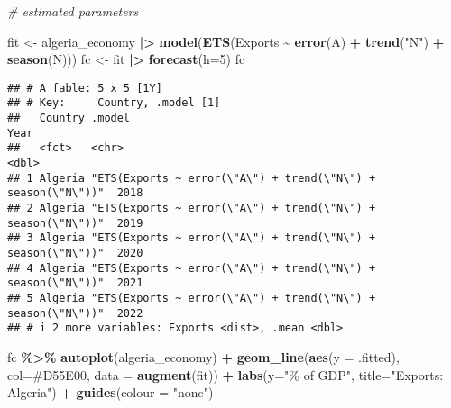 \documentclass[
]{article}
\newenvironment{Shaded}{\begin{snugshade}}{\end{snugshade}}
\newcommand{\AttributeTok}[1]{\textcolor[rgb]{0.13,0.29,0.53}{#1}}
\newcommand{\CommentTok}[1]{\textcolor[rgb]{0.56,0.35,0.01}{\textit{#1}}}
\newcommand{\DecValTok}[1]{\textcolor[rgb]{0.00,0.00,0.81}{#1}}
\newcommand{\FunctionTok}[1]{\textcolor[rgb]{0.13,0.29,0.53}{\textbf{#1}}}
\newcommand{\NormalTok}[1]{#1}
\newcommand{\OtherTok}[1]{\textcolor[rgb]{0.56,0.35,0.01}{#1}}
\newcommand{\SpecialCharTok}[1]{\textcolor[rgb]{0.81,0.36,0.00}{\textbf{#1}}}
\newcommand{\StringTok}[1]{\textcolor[rgb]{0.31,0.60,0.02}{#1}}
\begin{document}
\begin{Shaded}
\begin{Highlighting}[]
\CommentTok{\# estimated parameters }

\NormalTok{fit }\OtherTok{\textless{}{-}}\NormalTok{ algeria\_economy }\SpecialCharTok{|\textgreater{}} 
  \FunctionTok{model}\NormalTok{(}\FunctionTok{ETS}\NormalTok{(Exports }\SpecialCharTok{\textasciitilde{}} \FunctionTok{error}\NormalTok{(}\StringTok{\textquotesingle{}A\textquotesingle{}}\NormalTok{) }\SpecialCharTok{+} \FunctionTok{trend}\NormalTok{(}\StringTok{"N"}\NormalTok{) }\SpecialCharTok{+} \FunctionTok{season}\NormalTok{(}\StringTok{\textquotesingle{}N\textquotesingle{}}\NormalTok{)))}
\NormalTok{fc }\OtherTok{\textless{}{-}}\NormalTok{ fit }\SpecialCharTok{|\textgreater{}} 
  \FunctionTok{forecast}\NormalTok{(}\AttributeTok{h=}\DecValTok{5}\NormalTok{)}
\NormalTok{fc}
\end{Highlighting}
\end{Shaded}

\begin{verbatim}
## # A fable: 5 x 5 [1Y]
## # Key:     Country, .model [1]
##   Country .model                                                        Year
##   <fct>   <chr>                                                        <dbl>
## 1 Algeria "ETS(Exports ~ error(\"A\") + trend(\"N\") + season(\"N\"))"  2018
## 2 Algeria "ETS(Exports ~ error(\"A\") + trend(\"N\") + season(\"N\"))"  2019
## 3 Algeria "ETS(Exports ~ error(\"A\") + trend(\"N\") + season(\"N\"))"  2020
## 4 Algeria "ETS(Exports ~ error(\"A\") + trend(\"N\") + season(\"N\"))"  2021
## 5 Algeria "ETS(Exports ~ error(\"A\") + trend(\"N\") + season(\"N\"))"  2022
## # i 2 more variables: Exports <dist>, .mean <dbl>
\end{verbatim}

\begin{Shaded}
\begin{Highlighting}[]
\NormalTok{fc }\SpecialCharTok{\%\textgreater{}\%} \FunctionTok{autoplot}\NormalTok{(algeria\_economy) }\SpecialCharTok{+} \FunctionTok{geom\_line}\NormalTok{(}\FunctionTok{aes}\NormalTok{(}\AttributeTok{y =}\NormalTok{ .fitted), }\AttributeTok{col=}\StringTok{\textquotesingle{}\#D55E00\textquotesingle{}}\NormalTok{,}
            \AttributeTok{data =} \FunctionTok{augment}\NormalTok{(fit)) }\SpecialCharTok{+}
  \FunctionTok{labs}\NormalTok{(}\AttributeTok{y=}\StringTok{"\% of GDP"}\NormalTok{, }\AttributeTok{title=}\StringTok{"Exports: Algeria"}\NormalTok{) }\SpecialCharTok{+} \FunctionTok{guides}\NormalTok{(}\AttributeTok{colour =} \StringTok{"none"}\NormalTok{)}
\end{Highlighting}
\end{Shaded}
\end{document}
